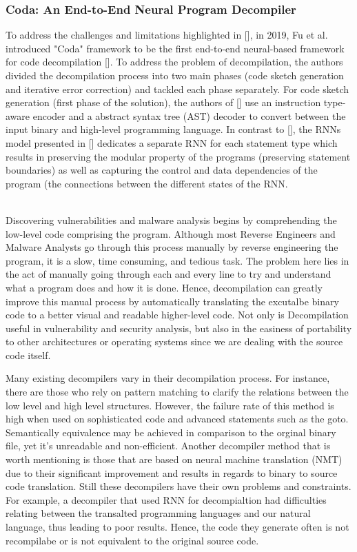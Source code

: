 \documentclass{article}
\begin{document}
\subsubsection{Coda: An End-to-End Neural Program Decompiler}
\noindent To address the challenges and limitations highlighted in [], in 2019, Fu et al. introduced "Coda" framework to be the first end-to-end neural-based framework for code decompilation [].
To address the problem of decompilation, the authors divided the decompilation process into two main phases (code sketch generation and iterative error correction) and tackled each phase separately.
For code sketch generation (first phase of the solution), the authors of [] use an instruction type-aware encoder and a abstract syntax tree (AST) decoder to convert between the input binary and high-level programming language.
In contrast to [], the RNNs model presented in [] dedicates a separate RNN for each statement type which results in preserving the modular property of the programs (preserving statement boundaries) as well as capturing the control and data dependencies of the program (the connections between the different states of the RNN.  \\\\




Discovering vulnerabilities and malware analysis begins by comprehending the low-level code comprising the program. Although most Reverse Engineers and Malware Analysts go through this process manually by reverse engineering
the program, it is a slow, time consuming, and tedious task. The problem here lies in the act of manually going through each and every line to try and understand what a program does and how it is done.
Hence, decompilation can greatly improve this manual process by automatically translating the excutalbe binary code to a better visual and readable higher-level code. Not only is Decompilation useful in vulnerability and security analysis, but also in the
easiness of portability to other architectures or operating systems since we are dealing with the source code itself.

Many existing decompilers vary in their decompilation process. For instance, there are those who rely on pattern matching to clarify the relations between the low level and high level structures. However, the failure rate of this method is high when used on sophisticated code and advanced statements
such as the goto. Semantically equivalence may be achieved in comparison to the orginal binary file, yet it's unreadable and non-efficient. Another decompiler method that is worth mentioning is those that are based on neural machine translation (NMT) due to their significant improvement and results in regards to binary to source code translation.
Still these decompilers have their own problems and constraints. For example, a decompiler that used RNN for decompialtion had difficulties relating between the transalted programming languages and our natural language, thus leading to poor results. Hence, the code they generate often is not recompilabe or is not equivalent to the original source code.
\end{document}
